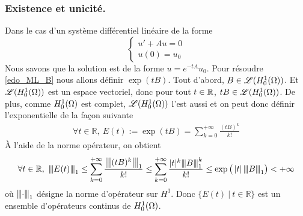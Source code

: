 \subsubsection*{Existence et unicité.} 
Dans le cas d'un système différentiel linéaire de la forme
\begin{equation*}
    \left\{\begin{array}{c}
        u' + Au = 0 \\
        u(0) = u_0
    \end{array}\right.
\end{equation*}
Nous savons que la solution est de la forme $u = e^{-tA} u_0$. Pour résoudre \eqref{edo_ML_B} nous allons définir $\exp(tB)$. Tout d'abord, $B \in \mathscr{L}(\Hone)$. Et $\mathscr{L}(\Hone)$ est un espace vectoriel, donc pour tout $t \in \bbR$, $t B \in \mathscr{L}(\Hone)$. De plus, comme $\Hone$ est complet, $\mathscr{L}(\Hone)$ l'est aussi et on peut donc définir l'exponentielle de la façon suivante
\begin{eqnarray*}
\forall t \in \mathbb{R},\  E(t) := \exp(tB) = \sum_{k=0}^{+\infty} \frac{(tB)^k}{k!}
\end{eqnarray*}
À l'aide de la norme opérateur, on obtient
\begin{equation*}
    \forall t\in \mathbb{R}, \ \vertiii{E(t)}_{1} \leq \sum_{k=0}^{+\infty}\frac{\vertiii{(tB)^k}_{1}}{k!} \leq \sum_{k=0}^{+\infty}\frac{|t|^k\vertiii{B}_{1}^k}{k!} \leq \exp\big(\abs{t}\vertiii{B}_1\big) < +\infty
\end{equation*}
où $\vertiii{\cdot}_1$ désigne la norme d'opérateur sur $H^1$. Donc $\{ E(t) \ | \ t \in \mathbb{R} \} $ est un ensemble d'opérateurs continus de $\Hone$.
